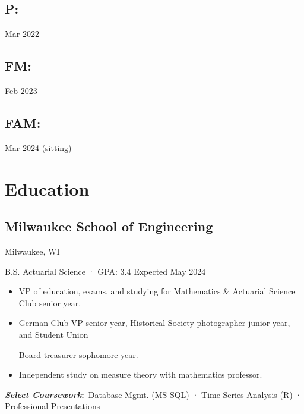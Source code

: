 \documentclass[12pt]{article}
\newcommand{\itemspace}{\vspace{0.1870em}}
\renewcommand{\textsc}[1]{\uppercase{\footnotesize#1}\normalsize}
\newcommand\textbox[1]
    {\parbox{.375\textwidth}{#1}} %
\begin{document}

\textbox{\subsection{P:} {Mar 2022}\hfill}
\textbox{\hfil \subsection{FM:} {Feb 2023}}
\textbox{\hfill\subsection{FAM:} {Mar 2024 (sitting)}}

\itemspace

\section{Education}

\subsection{Milwaukee School of Engineering} \hfill Milwaukee, WI

B.S. Actuarial Science · GPA: 3.4 \hfill Expected May 2024

\begin{itemize}[noitemsep,nolistsep]
  \item VP of education, exams, and studying for Mathematics \& Actuarial
    Science Club senior year.

  \item German Club VP senior year, Historical Society photographer junior
    year, and Student Union

    Board treasurer sophomore year.

  \item Independent study on measure theory with mathematics professor.
\end{itemize}

\textbf{\textit{Select Coursework}:} \,Database Mgmt. (\textsc{ms sql}) ·
Time Series Analysis (\textsc{R}) · Professional Presentations

\itemspace

\end{document}
